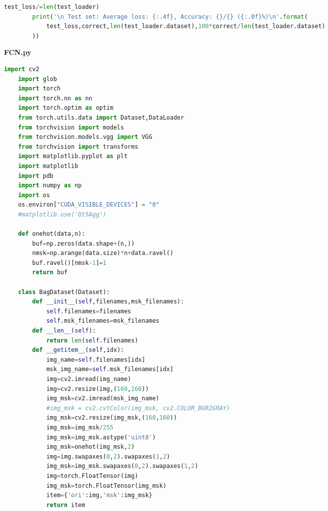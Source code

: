 \documentclass[supercite]{HustGraduPaper}
\begin{document}
\begin{sloppypar}
\begin{appendices}
\begin{spacing}{1.25}
\begin{lstlisting}[language=python]
        test_loss/=len(test_loader)
        print('\n Test set: Average loss: {:.4f}, Accuracy: {}/{} ({:.0f}%)\n'.format(
            test_loss,correct,len(test_loader.dataset),100*correct/len(test_loader.dataset)
        ))
  \end{lstlisting}
\end{spacing}
\textbf{FCN.py}
  \begin{spacing}{1.25}
  \begin{lstlisting}[language=python]
    import cv2
    import glob
    import torch
    import torch.nn as nn
    import torch.optim as optim
    from torch.utils.data import Dataset,DataLoader
    from torchvision import models
    from torchvision.models.vgg import VGG
    from torchvision import transforms
    import matplotlib.pyplot as plt
    import matplotlib
    import pdb
    import numpy as np
    import os
    os.environ["CUDA_VISIBLE_DEVICES"] = "0"
    #matplotlib.use('Qt5Agg')
    
    def onehot(data,n):
        buf=np.zeros(data.shape+(n,))
        nmsk=np.arange(data.size)*n+data.ravel()
        buf.ravel()[nmsk-1]=1
        return buf
    
    class BagDataset(Dataset):
        def __init__(self,filenames,msk_filenames):
            self.filenames=filenames
            self.msk_filenames=msk_filenames
        def __len__(self):
            return len(self.filenames)
        def __getitem__(self,idx):
            img_name=self.filenames[idx]
            msk_img_name=self.msk_filenames[idx]
            img=cv2.imread(img_name)
            img=cv2.resize(img,(160,160))
            img_msk=cv2.imread(msk_img_name)
            #img_msk = cv2.cvtColor(img_msk, cv2.COLOR_BGR2GRAY)
            img_msk=cv2.resize(img_msk,(160,160))
            img_msk=img_msk/255
            img_msk=img_msk.astype('uint8')
            img_msk=onehot(img_msk,2)
            img=img.swapaxes(0,2).swapaxes(1,2)
            img_msk=img_msk.swapaxes(0,2).swapaxes(1,2)
            img=torch.FloatTensor(img)
            img_msk=torch.FloatTensor(img_msk)
            item={'ori':img,'msk':img_msk}
            return item
    

\end{lstlisting}
\end{spacing}
\end{appendices}
\end{sloppypar}
\end{document}
